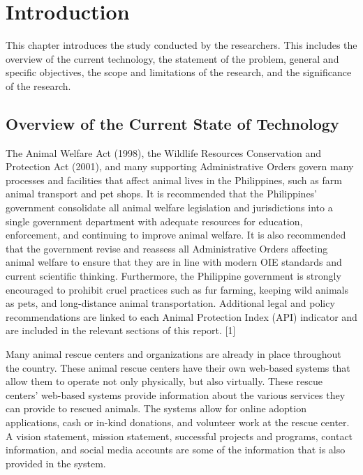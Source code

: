 \chapter{Introduction}
\label{sec:researchdesc}    %
This chapter introduces the study conducted by the researchers. This includes the overview of the current technology, the statement of the problem, general and specific objectives, the scope and limitations of the research, and the significance of the research. 

\section{Overview of the Current State of Technology}
\label{sec:overview}

The Animal Welfare Act (1998), the Wildlife Resources Conservation and
Protection Act (2001), and many supporting Administrative Orders govern many
processes and facilities that affect animal lives in the Philippines, such as farm
animal transport and pet shops. It is recommended that the Philippines’ government
consolidate all animal welfare legislation and jurisdictions into a single
government department with adequate resources for education, enforcement, and
continuing to improve animal welfare. It is also recommended that the government
revise and reassess all Administrative Orders affecting animal welfare to ensure
that they are in line with modern OIE standards and current scientific thinking.
Furthermore, the Philippine government is strongly encouraged to prohibit cruel
practices such as fur farming, keeping wild animals as pets, and long-distance
animal transportation. Additional legal and policy recommendations are linked
to each Animal Protection Index (API) indicator and are included in the relevant
sections of this report. [1]
   
Many animal rescue centers and organizations are already in place throughout
the country. These animal rescue centers have their own web-based systems that
allow them to operate not only physically, but also virtually. These rescue centers’
web-based systems provide information about the various services they can provide
to rescued animals. The systems allow for online adoption applications, cash or
in-kind donations, and volunteer work at the rescue center. A vision statement,
mission statement, successful projects and programs, contact information, and
social media accounts are some of the information that is also provided in the
system.


